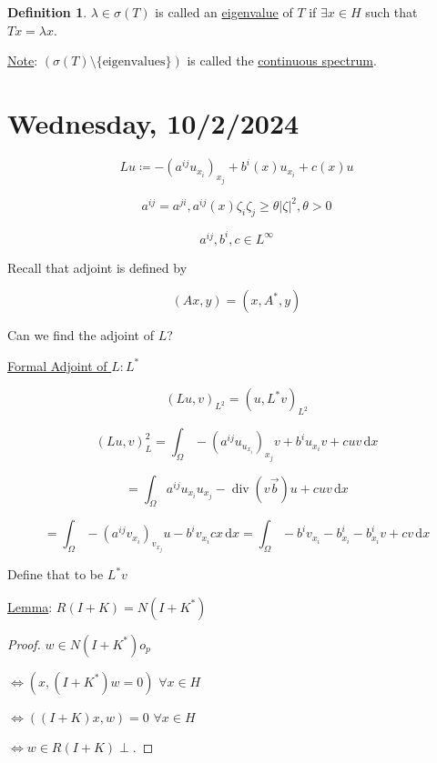 \documentclass{article}
\theoremstyle{definition}
\newtheorem{definition}{Definition}
\begin{document}
\begin{definition}
    \(\lambda \in \sigma (T)\) is called an \underline{eigenvalue} of \(T\) if \(\exists x \in H\) such that \(Tx = \lambda x\).
\end{definition}

\underline{Note}: \((\sigma (T) \setminus \{ \text{eigenvalues} \})\) is called the \underline{continuous spectrum}.

\section*{Wednesday, 10/2/2024}

\[
    Lu \coloneqq -(a^{ij}u_{x_i})_{x_j} + b^i (x)u_{x_i} + c(x)u
\]

\[
    a^{ij} = a^{ji} , a^{ij}(x)\zeta_i \zeta_j \geq \theta \vert \zeta \vert ^ 2, \theta > 0
\]

\[
    a^{ij}, b^i, c \in L^{\infty}
\]

Recall that adjoint is defined by

\[
    (Ax,y) = (x,A^{\ast}, y)
\]

Can we find the adjoint of \(L\)?

\underline{Formal Adjoint of \(L: L^{\ast}\)} 

\[
    (Lu, v)_{L^2} = (u, L^{\ast} v)_{L^2}
\]

\[
    (Lu,v)_L^{2} = \int_\Omega - (a^{ij}u_{u_{x_i}})_{x_j}v + b^i u_{x_i} v + c u v \, \mathrm{d}x
\]

\[
    = \int_\Omega a^{ij} u_{x_i} u_{x_j} - \operatorname{div}(v \vec{b}) u + c u v \, \mathrm{d}x
\]

\[
    = \int_\Omega -(a^{ij} v_{x_i})_{v_{x_{j} }}u - b^i v_{x_i} 
    cx \, \mathrm{d}x = \int_\Omega- b^i v_{x_i} - b^i_{x_i} - b^i_{x_i} v  + cv \, \mathrm{d} x
\]

Define that to be \(L^{\ast} v\) 

\underline{Lemma}: \(R(I+K) = N(I + K^{\ast})\) 
\begin{proof}
    \(w\in N(I+K^{\ast}) o_{p} \) 

    \(\iff (x, (I+K^{\ast})w = 0)\) \(\forall x\in H\) 

    \(\iff ((I+K)x, w) = 0 \) \(\forall x\in H\)
    
    \(\iff w \in R(I+K) \perp\).
\end{proof}
\end{document}
